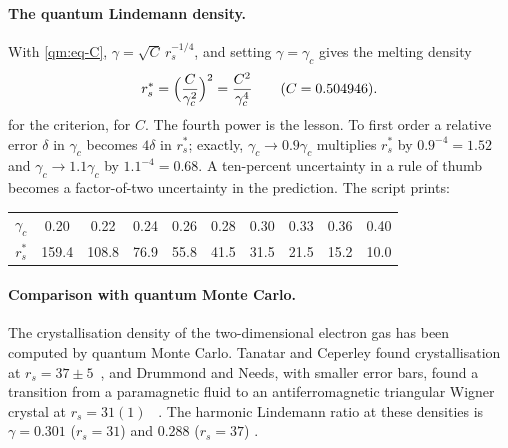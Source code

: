 \paragraph{The quantum Lindemann density.} With \eqref{qm:eq-C}, $\gamma=\sqrt C\,r_s^{-1/4}$, and setting
$\gamma=\gamma_c$ gives the melting density
\begin{equation}\label{qm:eq-rsstar}
r_s^\ast=\Bigl(\frac{C}{\gamma_c^2}\Bigr)^{2}=\frac{C^2}{\gamma_c^4}\qquad(C=0.504946).
\end{equation}
\tierC{} for the criterion, \tierX{} for $C$. The fourth power is the lesson. To first order a relative error
$\delta$ in $\gamma_c$ becomes $4\delta$ in $r_s^\ast$; exactly, $\gamma_c\to0.9\gamma_c$ multiplies $r_s^\ast$ by
$0.9^{-4}=1.52$ and $\gamma_c\to1.1\gamma_c$ by $1.1^{-4}=0.68$. A ten-percent uncertainty in a rule of thumb becomes
a factor-of-two uncertainty in the prediction. The script prints:
\begin{center}
\begin{tabular}{c|ccccccccc}
\toprule
$\gamma_c$ & 0.20 & 0.22 & 0.24 & 0.26 & 0.28 & 0.30 & 0.33 & 0.36 & 0.40\\
$r_s^\ast$ & 159.4 & 108.8 & 76.9 & 55.8 & 41.5 & 31.5 & 21.5 & 15.2 & 10.0\\
\bottomrule
\end{tabular}
\end{center}

\paragraph{Comparison with quantum Monte Carlo.} The crystallisation density of the two-dimensional electron gas has
been computed by quantum Monte Carlo. Tanatar and Ceperley found crystallisation at $r_s=37\pm5$~\cite{tanatar}, and
Drummond and Needs, with smaller error bars, found a transition from a paramagnetic fluid to an antiferromagnetic
triangular Wigner crystal at $r_s=31(1)$~\cite{dn2009} \tierL. The harmonic Lindemann ratio at these densities is
$\gamma=0.301$ ($r_s=31$) and $0.288$ ($r_s=37$) \tierX.

